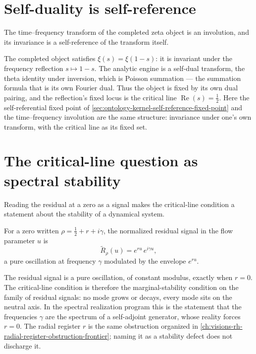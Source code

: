 \section{Self-duality is self-reference}
\label{sec:ontology-kernel-self-duality}

The time--frequency transform of the completed zeta object is an involution,
and its invariance is a self-reference of the transform itself.

\begin{principle}
\label{prin:ontology-kernel-functional-equation-selfdual}
The completed object satisfies $\xi(s)=\xi(1-s)$: it is invariant under the
frequency reflection $s\mapsto1-s$.  The analytic engine is a self-dual
transform, the theta identity under inversion, which is Poisson summation ---
the summation formula that is its own Fourier dual.  Thus the object is fixed by
its own dual pairing, and the reflection's fixed locus is the critical line
$\operatorname{Re}(s)=\tfrac12$.  Here the self-referential fixed point of
\autoref{sec:ontology-kernel-self-reference-fixed-point} and the
time--frequency involution are the same structure: invariance under one's own
transform, with the critical line as its fixed set.
\end{principle}

\section{The critical-line question as spectral stability}
\label{sec:ontology-kernel-spectral-stability}

Reading the residual at a zero as a signal makes the critical-line condition a
statement about the stability of a dynamical system.

\begin{definition}
\label{def:ontology-kernel-zero-residual-signal}
For a zero written $\rho=\tfrac12+r+i\gamma$, the normalized residual signal in
the flow parameter $u$ is
$$
\widetilde R_\rho(u)=e^{r u}\,e^{i\gamma u},
$$
a pure oscillation at frequency $\gamma$ modulated by the envelope $e^{ru}$.
\end{definition}

\begin{principle}
\label{prin:ontology-kernel-critical-line-stability}
The residual signal is a pure oscillation, of constant modulus, exactly when
$r=0$.  The critical-line condition is therefore the marginal-stability
condition on the family of residual signals: no mode grows or decays, every mode
sits on the neutral axis.  In the spectral realization program this is the
statement that the frequencies $\gamma$ are the spectrum of a self-adjoint
generator, whose reality forces $r=0$.  The radial register $r$ is the same
obstruction organized in
\autoref{ch:visions-rh-radial-register-obstruction-frontier}; naming it as a
stability defect does not discharge it.
\end{principle}

